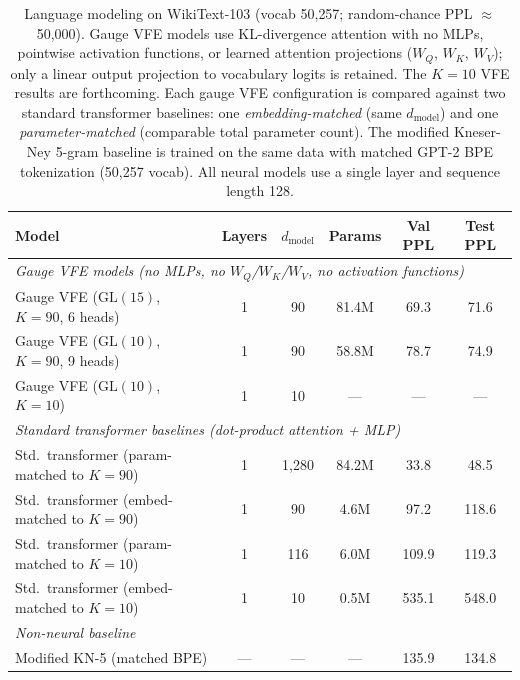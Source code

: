 \documentclass[twoside,11pt]{article}
\begin{document}
\begin{table}[h]
\centering
\begin{tabular}{lccccc}
\hline
\textbf{Model} & \textbf{Layers} & $d_{\text{model}}$ & \textbf{Params} & \textbf{Val PPL} & \textbf{Test PPL} \\
\hline
\multicolumn{6}{l}{\textit{Gauge VFE models (no MLPs, no $W_Q$/$W_K$/$W_V$, no activation functions)}} \\
Gauge VFE ($\mathrm{GL}(15)$, $K\!=\!90$, 6 heads) & 1 & 90 & 81.4M & 69.3 & 71.6 \\
Gauge VFE ($\mathrm{GL}(10)$, $K\!=\!90$, 9 heads) & 1 & 90 & 58.8M & 78.7 & 74.9 \\
Gauge VFE ($\mathrm{GL}(10)$, $K\!=\!10$) & 1 & 10 & ---   & ---  & ---  \\
\hline
\multicolumn{6}{l}{\textit{Standard transformer baselines (dot-product attention + MLP)}} \\
Std.\ transformer (param-matched to $K\!=\!90$) & 1 & 1{,}280 & 84.2M & 33.8 & 48.5 \\
Std.\ transformer (embed-matched to $K\!=\!90$) & 1 & 90    & 4.6M  & 97.2 & 118.6 \\
Std.\ transformer (param-matched to $K\!=\!10$) & 1 & 116   & 6.0M  & 109.9 & 119.3 \\
Std.\ transformer (embed-matched to $K\!=\!10$) & 1 & 10    & 0.5M  & 535.1 & 548.0 \\
\hline
\multicolumn{6}{l}{\textit{Non-neural baseline}} \\
Modified KN-5 (matched BPE) & --- & --- & --- & 135.9 & 134.8 \\
\hline
\end{tabular}
\caption{Language modeling on WikiText-103 (vocab 50{,}257; random-chance PPL $\approx$ 50{,}000). Gauge VFE models use KL-divergence attention with no MLPs, pointwise activation functions, or learned attention projections ($W_Q$, $W_K$, $W_V$); only a linear output projection to vocabulary logits is retained. The $K\!=\!10$ VFE results are forthcoming. Each gauge VFE configuration is compared against two standard transformer baselines: one \emph{embedding-matched} (same $d_{\text{model}}$) and one \emph{parameter-matched} (comparable total parameter count). The modified Kneser-Ney 5-gram baseline \citep{chen1998empirical} is trained on the same data with matched GPT-2 BPE tokenization (50{,}257 vocab). All neural models use a single layer and sequence length 128.}
\label{tab:glk_results}
\end{table}
\end{document}
